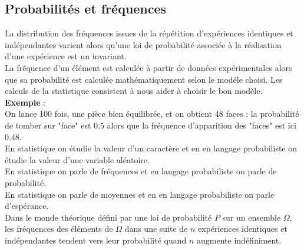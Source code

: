 \documentclass[a4paper,11pt]{book}
\begin{document}
\subsection{Probabilit\'es et fr\'equences}
La distribution des fr\'equences issues de la r\'ep\'etition d'exp\'eriences 
identiques et ind\'ependantes varient alors qu'une loi de probabilit\'e
associ\'ee \`a la r\'ealisation d'une exp\'erience est un invariant.\\
La fr\'equence d'un \'el\'ement est calcul\'ee \`a partir de donn\'ees 
exp\'erimentales alors que sa probabilit\'e est calcul\'ee math\'ematiquement 
selon le mod\'ele choisi. Les calculs de la  statistique consistent \`a nous 
aider \`a choisir le bon mod\`ele.\\
{\bf Exemple} :\\
On lance 100 fois, une pi\`ece bien \'equilibr\'ee, et on obtient 48 faces : 
la probabilit\'e
de tomber sur "face" est 0.5 alors que la fr\'equence d'apparition des 
"faces" est ici 0.48.\\
En statistique on \'etudie la valeur d'un caract\`ere et en en langage 
probabiliste on \'etudie la valeur d'une variable al\'eatoire.\\
En statistique on parle de fr\'equences et en langage probabiliste on parle de 
probabilit\'e.\\
En statistique on parle de moyennes et en en langage probabiliste on parle 
d'esp\'erance.\\
Dans le monde th\'eorique d\'efini par une loi de probabilit\'e $P$ sur un 
ensemble $\Omega$,
les fr\'equences des \'el\'ements de $\Omega$ dans une suite de $n$ 
exp\'eriences identiques et ind\'ependantes tendent vers leur probabilit\'e 
quand $n$ augmente ind\'efiniment.
\end{document}
